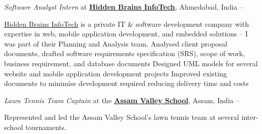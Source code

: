 \documentclass[a4paper,10pt,oneside]{article}
\begin{document}
\begin{body}
\begin{detailwithoutsubheading}
\end{detailwithoutsubheading}

\BigEntryGapNoBreak
\textit{Software Analyst Intern} at
\href{http://www.hiddenbrains.com/}
{\textbf{Hidden Brains InfoTech}},
Ahmedabad, India
\hfill
{} --
\EntryGapNoBreak
\begin{detailwithoutsubheading}
\href{http://www.hiddenbrains.com/}{Hidden Brains InfoTech} is a private IT \& software development company with expertise in web, mobile application development, and embedded solutions -- I was part of their Planning and Analysis team.
\BulletItem
Analysed client proposal documents, drafted software requirements specification (SRS), scope of work, business requirement, and database documents
\BulletItem
Designed UML models for several website and mobile application development projects
\BulletItem
Improved existing documents to minimise development required reducing delivery time and costs
\end{detailwithoutsubheading}

\BigEntryGapNoBreak
\textit{Lawn Tennis Team Captain} at the \href{http://www.assamvalleyschool.com}{\textbf{Assam Valley School}},
Assam, India
\hfill
{} --
\begin{detailwithoutsubheading}
\BulletItem
Represented and led the Assam Valley School's lawn tennis team at several inter-school tournaments.
\end{detailwithoutsubheading}
\vspace{-5pt}
\hline


\end{body}
\end{document}
